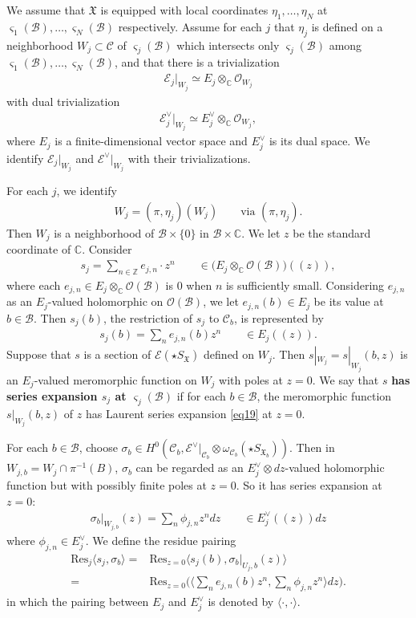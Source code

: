 \documentclass[12pt,a4paper,notitlepage]{article}
\theoremstyle{definition}
\theoremstyle{plain}
\newcommand{\fk}{\mathfrak}
\newcommand{\mc}{\mathcal}
\newcommand{\Res}{\mathrm{Res}}
\newcommand{\bk}[1]{\langle {#1}\rangle}
\newcommand{\scr}{\mathscr}
\newcommand{\sgm}{\varsigma}
\newcommand{\SX}{{S_{\fk X}}}
\newcommand{\Cbb}{\mathbb C}
\newcommand{\Zbb}{\mathbb Z}
\numberwithin{equation}{section}
\begin{document}
We assume that $\fk X$ is equipped with local coordinates $\eta_1,\dots,\eta_N$ at $\sgm_1(\mc B),\dots,\sgm_N(\mc B)$ respectively. Assume for each $j$ that  $\eta_j$ is defined on a neighborhood $W_j\subset\mc C$ of $\sgm_j(\mc B)$ which intersects only $\sgm_j(\mc B)$ among $\sgm_1(\mc B),\dots,\sgm_N(\mc B)$, and that there is a  trivialization
\begin{align*}
\scr E_j|_{W_j}\simeq E_j\otimes_\Cbb\scr O_{W_j}	
\end{align*}
with dual trivialization
\begin{align*}
\scr E_j^\vee|_{W_j}\simeq E_j^\vee\otimes_\Cbb\scr O_{W_j},	
\end{align*}
where $E_j$ is a finite-dimensional vector space and $E_j^\vee$ is its dual space. We identify $\scr E_j|_{W_j}$ and $\scr E^\vee|_{W_j}$ with their trivializations.

For each $j$, we identify
\begin{align*}
W_j=(\pi,\eta_j)(W_j)	\qquad\text{via }(\pi,\eta_j).
\end{align*}
Then $W_j$ is a neighborhood of $\mc B\times\{0\}$ in $\mc B\times\Cbb$. We let $z$ be the standard coordinate of $\Cbb$. Consider
\begin{gather}
s_j=\sum_{n\in\Zbb} e_{j,n}\cdot z^n\qquad \in\big(E_j\otimes_\Cbb\scr O(\mc B) \big)((z)),\label{eq19}	
\end{gather}
where each $e_{j,n}\in E_j\otimes_\Cbb\scr O(\mc B)$ is $0$ when $n$ is sufficiently small. Considering $e_{j,n}$ as an $E_j$-valued holomorphic on $\scr O(\mc B)$, we let $e_{j,n}(b)\in E_j$ be its value at $b\in\mc B$. Then $s_j(b)$, the restriction of $s_j$ to $\mc C_b$, is represented by
\begin{align*}
s_j(b)=\sum_n e_{j,n}(b)z^n\qquad\in E_j((z)).	
\end{align*} 
Suppose that $s$ is a section of $\scr E(\star\SX)$ defined on $W_j$. Then $s|_{W_j}=s|_{W_j}(b,z)$ is an $E_j$-valued meromorphic function on $W_j$ with poles at $z=0$. We say that $s$ \textbf{has series expansion $s_j$ at $\sgm_j(\mc B)$} if for each $b\in\mc B$, the meromorphic function $s|_{W_j}(b,z)$ of $z$ has Laurent series expansion \eqref{eq19} at $z=0$.



For each $b\in\mc B$, choose $\sigma_b\in H^0(\mc C_b,\scr E^\vee|_{\mc C_b}\otimes\omega_{\mc C_b}(\star S_{\fk X_b}))$. Then in $W_{j,b}=W_j\cap\pi^{-1}(B)$, $\sigma_b$ can be regarded as an $E_j^\vee\otimes dz$-valued holomorphic function but with possibly finite poles at $z=0$. So it has series expansion at $z=0$:
\begin{align*}
\sigma_b|_{W_{j,b}}(z)=\sum_n\phi_{j,n}z^ndz\qquad \in E_j^\vee((z))dz	
\end{align*}
where $\phi_{j,n}\in E_j^\vee$. We define the residue pairing
\begin{align}
\Res_j \bk{s_j,\sigma_b}=&\Res_{z=0}\langle s_j(b),\sigma_b|_{U_j,b}(z) \rangle\nonumber\\
=&\Res_{z=0}\bigg(\Big\langle \sum_n e_{j,n}(b)z^n, \sum_n \phi_{j,n}z^n  \Big\rangle dz\bigg).
\end{align} 
in which the pairing between $E_j$ and $E_j^\vee$ is denoted by $\bk{\cdot,\cdot}$.
\end{document}
